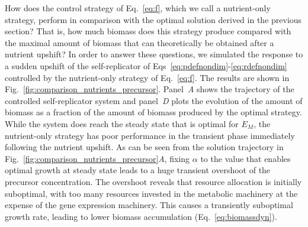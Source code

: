 How does the control strategy of Eq.~\ref{eq:f}, which we call a nutrient-only strategy, perform in comparison with the optimal solution derived in the previous section?
That is, how much biomass does this strategy produce compared with the maximal amount of biomass that can theoretically be obtained after a nutrient upshift?
In order to answer these questions, we simulated the response to a sudden upshift of the self-replicator of Eqs~\ref{eq:pdefnondim}-\ref{eq:rdefnondim} controlled by the nutrient-only strategy of Eq.~\ref{eq:f}.
The results are shown in Fig.~\ref{fig:comparison_nutrients_precursor}.
Panel~\textit{A} shows the trajectory of the controlled self-replicator system and panel~\textit{D} plots the evolution of the amount of biomass as a fraction of the amount of biomass produced by the optimal strategy.
While the system does reach the steady state that is optimal for $E_M$, the nutrient-only strategy has poor performance in the transient phase immediately following the nutrient upshift.
As can be seen from the solution trajectory in Fig.~\ref{fig:comparison_nutrients_precursor}\textit{A}, fixing $\alpha$ to the value that enables optimal growth at steady state leads to a huge transient overshoot of the precursor concentration.
The overshoot reveals that resource allocation is initially suboptimal, with too many resources invested in the metabolic machinery at the expense of the gene expression machinery.
This causes a transiently suboptimal growth rate, leading to lower biomass accumulation (Eq.~\ref{eq:biomassdyn}).

